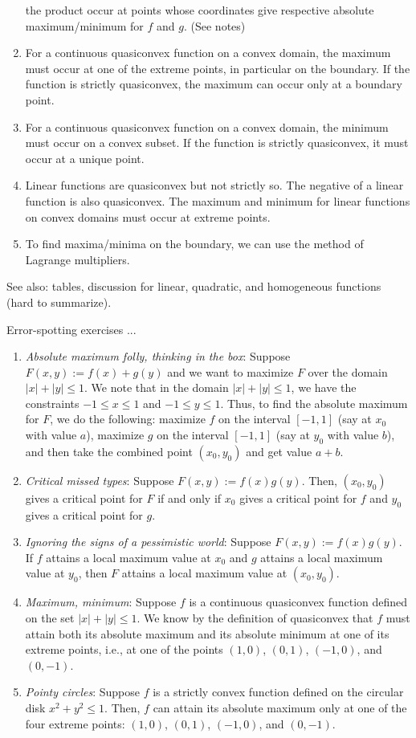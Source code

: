 \documentclass[10pt]{amsart}
\begin{document}
\begin{enumerate}
  the product occur at points whose coordinates give respective
  absolute maximum/minimum for $f$ and $g$. (See notes)
\item For a continuous quasiconvex function on a convex domain, the
  maximum must occur at one of the extreme points, in
  particular on the boundary. If the function is strictly quasiconvex,
  the maximum can occur only at a boundary point.
\item For a continuous quasiconvex function on a convex domain, the
  minimum must occur on a convex subset. If the function is strictly
  quasiconvex, it must occur at a unique point.
\item Linear functions are quasiconvex but not strictly so. The
  negative of a linear function is also quasiconvex. The maximum and
  minimum for linear functions on convex domains must occur at extreme
  points.
\item To find maxima/minima on the boundary, we can use the method of
  Lagrange multipliers.
\end{enumerate}

See also: tables, discussion for linear, quadratic, and homogeneous
functions (hard to summarize).

Error-spotting exercises ...

\begin{enumerate}
\item {\em Absolute maximum folly, thinking in the box}: Suppose
  $F(x,y) := f(x) + g(y)$ and we want to maximize $F$ over the domain
  $|x| + |y| \le 1$. We note that in the domain $|x| + |y| \le 1$, we
  have the constraints $-1 \le x \le 1$ and $-1 \le y \le 1$. Thus, to
  find the absolute maximum for $F$, we do the following: maximize $f$
  on the interval $[-1,1]$ (say at $x_0$ with value $a$), maximize $g$
  on the interval $[-1,1]$ (say at $y_0$ with value $b$), and then
  take the combined point $(x_0,y_0)$ and get value $a + b$.
\item {\em Critical missed types}: Suppose $F(x,y) := f(x)g(y)$. Then,
  $(x_0,y_0)$ gives a critical point for $F$ if and only if $x_0$
  gives a critical point for $f$ and $y_0$ gives a critical point for
  $g$.
\item {\em Ignoring the signs of a pessimistic world}: Suppose $F(x,y)
  := f(x)g(y)$. If $f$ attains a local maximum value at $x_0$ and $g$
  attains a local maximum value at $y_0$, then $F$ attains a local
  maximum value at $(x_0,y_0)$.
\item {\em Maximum, minimum}: Suppose $f$ is a continuous quasiconvex
  function defined on the set $|x| + |y| \le 1$. We know by the
  definition of quasiconvex that $f$ must attain both its absolute
  maximum and its absolute minimum at one of its extreme points, i.e.,
  at one of the points $(1,0)$, $(0,1)$, $(-1,0)$, and $(0,-1)$.
\item {\em Pointy circles}: Suppose $f$ is a strictly convex function
  defined on the circular disk $x^2 + y^2 \le 1$. Then, $f$ can attain
  its absolute maximum only at one of the four extreme points:
  $(1,0)$, $(0,1)$, $(-1,0)$, and $(0,-1)$.
\end{enumerate}
\end{document}
